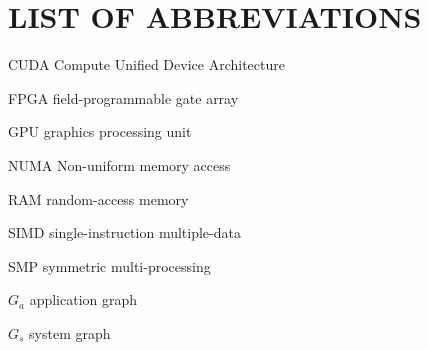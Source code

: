 \documentclass[tocnosub,noragright,centerchapter,12pt]{uiucecethesis09}
\begin{document}
%
\chapter{LIST OF ABBREVIATIONS}

\begin{symbollist*}
	\item[CUDA] Compute Unified Device Architecture
	\item[FPGA] field-programmable gate array
	\item[GPU] graphics processing unit
	\item[NUMA] Non-uniform memory access
	\item[RAM] random-access memory
	\item[SIMD] single-instruction multiple-data
	\item[SMP] symmetric multi-processing
\end{symbollist*}


%
\begin{symbollist}[0.7in]
	\item[$G_a$] application graph
	\item[$G_s$] system graph
\end{symbollist}

\mainmatter

%










%
\appendix
\begin{appendices}
	
	
\end{appendices}

\backmatter

%


\end{document}
